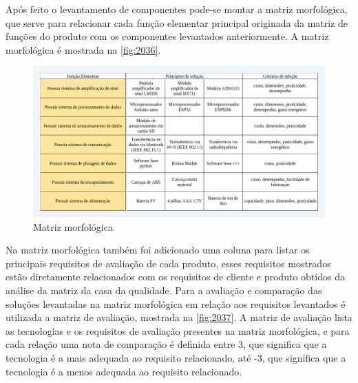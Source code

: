 Após feito o levantamento de componentes pode-se montar a matriz morfológica, que serve para relacionar cada função elementar principal originada da matriz de
funções do produto com os componentes levantados anteriormente.
A matriz morfológica é mostrada na \autoref{fig:2036}.

\begin{figure}[H]
	\caption{\label{fig:2036} Matriz morfológica}
	\begin{center}
		\includegraphics[width=600, angle=90]{pictures/2036.png}
	\end{center}
\end{figure}

Na matriz morfológica também foi adicionado uma coluna para listar os principais requisitos de avaliação de cada produto, esses requisitos mostrados estão diretamente
relacionados com os requisitos de cliente e produto obtidos da análise da matriz da casa da qualidade.
Para a avaliação e comparação das soluções levantadas na matriz morfológica em relação aos requisitos levantados é utilizada a matriz de avaliação,
mostrada na \autoref{fig:2037}.
A matriz de avaliação lista as tecnologias e os requisitos de avaliação presentes na matriz morfológica,
e para cada relação uma nota de comparação é definida entre 3, que significa que a tecnologia é a mais adequada ao requisito relacionado,
até -3, que significa que a tecnologia é a menos adequada ao requisito relacionado.

